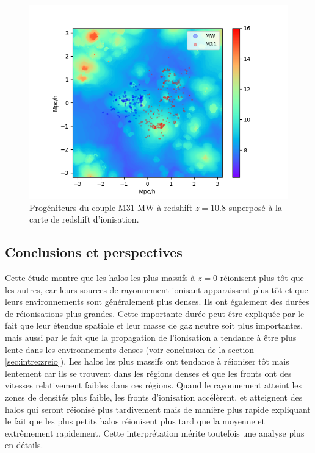 \begin{figure}
		\centering
		\includegraphics[width=.95\linewidth]{img/05/map_LG.png}
        \caption[Réionisation du groupe local]{Progéniteurs du couple M31-MW à redshift $z=10.8$ superposé à la carte de redshift d'ionisation.
		\label{fig:CODA_LG}}
\end{figure}


\subsection{Conclusions et perspectives}


Cette étude montre que les halos les plus massifs à $z=0$ réionisent plus tôt que les autres, car leurs sources de rayonnement ionisant apparaissent plus tôt et que leurs environnements sont généralement plus denses.
Ils ont également des durées de réionisations plus grandes.
Cette importante durée peut être expliquée par le fait que leur étendue spatiale et leur masse de gaz neutre soit plus importantes, mais aussi par le fait que la propagation de l'ionisation a tendance à être plus lente dans les environnements denses (voir conclusion de la section \ref{sec:intre:zreio}).
Les halos les plus massifs ont tendance à réioniser tôt mais lentement car ils se trouvent dans les régions denses et que les fronts ont des vitesses relativement faibles dans ces régions. %
Quand le rayonnement atteint les zones de densités plus faible, les fronts d'ionisation accélèrent, et atteignent des halos qui seront réionisé plus tardivement mais de manière plus rapide expliquant le fait que les plus petits halos réionisent plus tard que la moyenne et extrêmement rapidement.
Cette interprétation mérite toutefois une analyse plus en détails.

